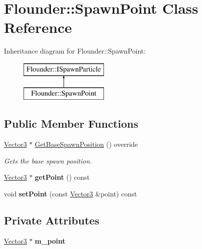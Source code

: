 \hypertarget{class_flounder_1_1_spawn_point}{}\section{Flounder\+:\+:Spawn\+Point Class Reference}
\label{class_flounder_1_1_spawn_point}
Inheritance diagram for Flounder\+:\+:Spawn\+Point\+:\begin{figure}[H]
\begin{center}
\leavevmode
\includegraphics[height=2.000000cm]{class_flounder_1_1_spawn_point}
\end{center}
\end{figure}
\subsection*{Public Member Functions}
\begin{DoxyCompactItemize}
\item 
\hyperlink{class_flounder_1_1_vector3}{Vector3} $\ast$ \hyperlink{class_flounder_1_1_spawn_point_a0bb1e9ba2fd2bce734de6dbb16246fd4}{Get\+Base\+Spawn\+Position} () override
\begin{DoxyCompactList}\small\item\em Gets the base spawn position. \end{DoxyCompactList}\item 
\mbox{\label{class_flounder_1_1_spawn_point_acf4eb438cf2d7a876cb26e0d05f7b2e5}} 
\hyperlink{class_flounder_1_1_vector3}{Vector3} $\ast$ {\bfseries get\+Point} () const
\item 
\mbox{\label{class_flounder_1_1_spawn_point_a9fb3c9f52db2bbfbbe6d0f9b6202592a}} 
void {\bfseries set\+Point} (const \hyperlink{class_flounder_1_1_vector3}{Vector3} \&point) const
\end{DoxyCompactItemize}
\subsection*{Private Attributes}
\begin{DoxyCompactItemize}
\item 
\mbox{\label{class_flounder_1_1_spawn_point_ac9255696c566e3d7fc9bdc3c7621f078}} 
\hyperlink{class_flounder_1_1_vector3}{Vector3} $\ast$ {\bfseries m\+\_\+point}
\end{DoxyCompactItemize}


